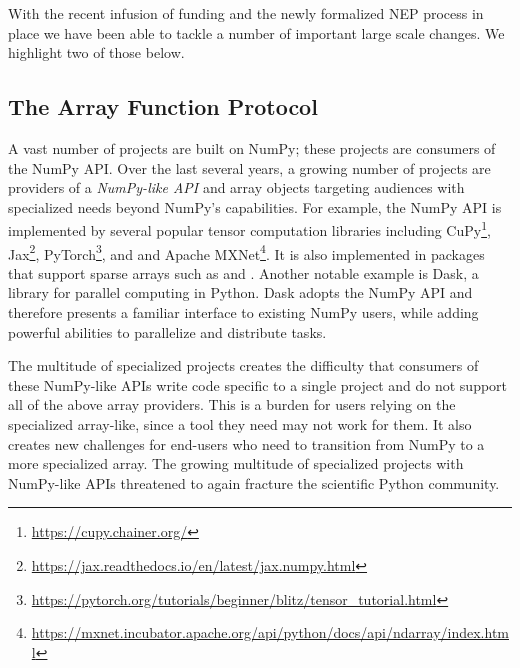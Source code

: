 

With the recent infusion of funding and the newly formalized NEP process in
place we have been able to tackle a number of important large scale changes.
We highlight two of those below.

\subsection{The Array Function Protocol}

A vast number of projects are built on NumPy;
these projects are consumers of the NumPy API.
Over the last several years, a growing number of projects are providers of
a \emph{NumPy-like API} and array objects targeting audiences with specialized
needs beyond NumPy's capabilities.
For example, the NumPy API is implemented by several popular tensor computation
libraries including CuPy\footnote{\url{https://cupy.chainer.org/}},
Jax\footnote{\url{https://jax.readthedocs.io/en/latest/jax.numpy.html}},
PyTorch\footnote{\url{https://pytorch.org/tutorials/beginner/blitz/tensor\_tutorial.html}}, and
and Apache MXNet\footnote{\url{https://mxnet.incubator.apache.org/api/python/docs/api/ndarray/index.html}}.
It is also implemented in packages that support sparse arrays
such as  and .
Another notable example is Dask, a library for parallel computing in
Python.  Dask adopts the NumPy API and therefore presents a familiar
interface to existing NumPy users, while adding powerful abilities to
parallelize and distribute tasks.

The multitude of specialized projects creates the difficulty that consumers
of these NumPy-like APIs write code specific to a single project and do not support
all of the above array providers.
This is a burden for users relying on the specialized array-like, since
a tool they need may not work for them.
It also creates new challenges for end-users who need to transition
from NumPy to a more specialized array.
The growing multitude of specialized projects with NumPy-like APIs threatened
to again fracture the scientific Python community.

